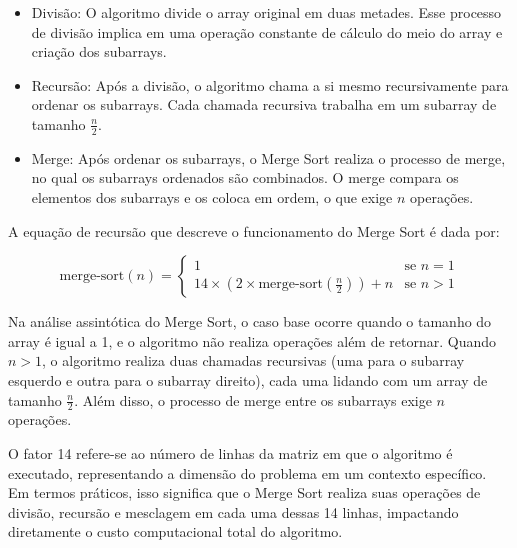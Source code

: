 \begin{itemize}
    \item Divisão: O algoritmo divide o array original em duas metades. Esse processo de divisão implica em uma operação constante de cálculo do meio do array e criação dos subarrays.
    \item Recursão: Após a divisão, o algoritmo chama a si mesmo recursivamente para ordenar os subarrays. Cada chamada recursiva trabalha em um subarray de tamanho \( \frac{n}{2} \).
    \item Merge: Após ordenar os subarrays, o Merge Sort realiza o processo de merge, no qual os subarrays ordenados são combinados. O merge compara os elementos dos subarrays e os coloca em ordem, o que exige \( n \) operações.
\end{itemize}

A equação de recursão que descreve o funcionamento do Merge Sort é dada por:

\[
\text{merge-sort}(n) = 
\begin{cases} 
1 & \text{se } n = 1 \\
14 \times \left( 2 \times \text{merge-sort}\left(\frac{n}{2}\right) \right) + n & \text{se } n > 1
\end{cases}
\]

Na análise assintótica do Merge Sort, o caso base ocorre quando o tamanho do array é igual a 1, e o algoritmo não realiza operações além de retornar. Quando \( n > 1 \), o algoritmo realiza duas chamadas recursivas (uma para o subarray esquerdo e outra para o subarray direito), cada uma lidando com um array de tamanho \( \frac{n}{2} \). Além disso, o processo de merge entre os subarrays exige \( n \) operações.

O fator 14 refere-se ao número de linhas da matriz em que o algoritmo é executado, representando a dimensão do problema em um contexto específico. Em termos práticos, isso significa que o Merge Sort realiza suas operações de divisão, recursão e mesclagem em cada uma dessas 14 linhas, impactando diretamente o custo computacional total do algoritmo.